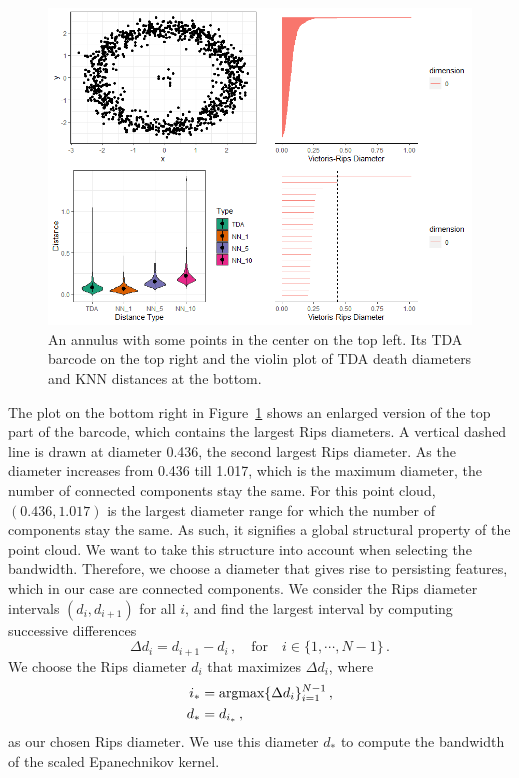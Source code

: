 \documentclass[letter,12pt]{article}
\newcommand{\argmax}{\mathop{\text{argmax}}}
\begin{document}
\begin{figure}[!ht]
    \centering
    \includegraphics[scale=0.8]{Graphics/TDA_and_KNN.png}
    \caption{An annulus with some points in the center on the top left. Its TDA barcode on the top right and the violin plot of TDA death diameters and KNN distances at the bottom.}
    \label{fig:TDAKNN}
\end{figure}

The plot on the bottom right in Figure~\ref{fig:TDAKNN} shows an enlarged version of the top part of the barcode, which contains the largest Rips diameters. A vertical dashed line is drawn at diameter 0.436, the second largest Rips diameter. As the diameter increases from 0.436 till 1.017, which is the maximum diameter, the number of connected components stay the same. For this point cloud, $(0.436, 1.017)$ is the largest diameter range for which the number of components stay the same. As such, it signifies a global structural property of the point cloud. We want to take this structure into account when selecting the bandwidth. Therefore, we choose a diameter that gives rise to persisting features, which in our case are connected components. We consider the Rips diameter intervals $(d_i, d_{i+1})$ for all $i$, and find the largest interval by computing successive differences 
\begin{equation}\label{eq:deathrad1}
    \Delta d_i = d_{i+1} - d_i\, ,  \quad \text{for} \quad i \in \{1, \cdots,  N-1 \} \, . 
\end{equation}
We choose the Rips diameter $d_i$ that maximizes $\Delta d_i$, where
\begin{align}\label{eq:deathrad2}
    i_* & = \argmax \{ \Delta d_i \}_{i=1}^{N-1}  \, , \notag\\
    d_* & = d_{i_*} \, ,
\end{align}
as our chosen Rips diameter. We use this diameter $d_*$ to compute the bandwidth of the scaled Epanechnikov kernel.  
\end{document}
